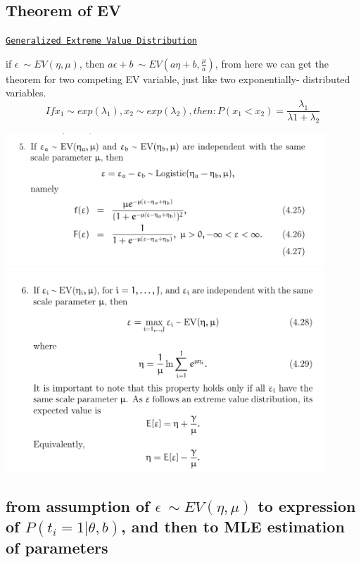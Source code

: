 \documentclass[a4paper,10pt]{article}
\begin{document}
\subsection{Theorem of EV}

\href{https://en.wikipedia.org/wiki/Generalized_extreme_value_distribution}{\texttt{Generalized Extreme Value Distribution}}

if $\epsilon ~\sim EV(\eta,\mu)$, then $a\epsilon+b ~\sim EV(a\eta+b,\frac{\mu}{a})$, from here we can get the theorem for two competing EV variable, just like two exponentially- distributed variables.\\

\begin{equation}
    If x_{1} \sim exp(\lambda_{1}),x_{2} \sim exp(\lambda_{2}), then: P(x_{1}<x_{2})=\frac{\lambda_{1}}{\lambda{1}+\lambda_{2}}
\end{equation}

\includegraphics[width=12cm]{1.png}\\
\includegraphics[width=12cm]{2.png}\\


\subsection{from assumption of $\epsilon ~\sim EV(\eta,\mu)$ to expression of $P(t_{i}=1|\theta,b)$, and then to MLE estimation of parameters}
\end{document}
